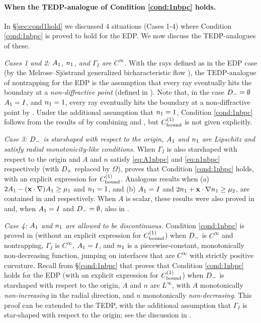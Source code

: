 \paragraph{When the TEDP-analogue of Condition \ref{cond:1nbpc} holds.}

In \S\ref{sec:cond1hold} we discussed 4 situations (Cases 1-4) where Condition \ref{cond:1nbpc} is proved to hold for the EDP. We now discuss the TEDP-analogues of these.

\emph{Cases 1 and 2: $A_{1}$, $n_{1}$, and $\Gamma_I$  are $C^\infty$.} 
With the rays defined as in the EDP case (by the Melrose--Sj{\"o}strand generalized bicharacteristic flow 
\cite[\S24.3]{Ho:85}), the TEDP-analogue of nontrapping for the EDP is the assumption that 
every ray eventually hits the boundary at a \emph{non-diffractive point} (defined in \cite[Page 1037]{BaLeRa:92}). Note that, in the case $D_{-}=\emptyset$ $A_{1}= I$, and $n_{1}=1$, every ray eventually hits the boundary at a non-diffractive point by \cite[Lemma 5.3]{BaSpWu:16}.
Under the additional assumption that $n_{1}= 1$, Condition \ref{cond:1nbpc} follows from the results of \cite{BaLeRa:92} by combining \cite[Theorem 1.8]{BaSpWu:16} and \cite[Remark 5.6]{BaSpWu:16}, but $C^{(1)}_{\rm bound}$ is not given explicitly.

\emph{Case 3: $D_{-}$ is starshaped with respect to the origin, $A_{1}$ and $n_{1}$ are Lipschitz and satisfy radial monotonicity-like conditions.}
When $\Gamma_I$ is also starshaped with respect to the origin and $A$ and $n$ satisfy \eqref{eq:A1nbpc} and \eqref{eq:n1nbpc} respectively (with $D_{+}$ replaced by $\Omega$), 
\cite[Theorem A.6(i)]{GrPeSp:19} proves that
Condition \ref{cond:1nbpc} holds, with an explicit expression for $C^{(1)}_{\rm bound}$. Analogous results when (a) $2A_{1} - (\mathbf{x}\cdot\nabla)A_{1} \geq \mu_1$ and $n_{1}= 1$,
and  (b) $A_{1}= I$ and  $2n_{1} + \mathbf{x} \cdot \nabla n_{1} \geq \mu_2$, 
are contained in \cite[Theorem A.6(ii)]{GrPeSp:19} and \cite[Theorem A.6(iii)]{GrPeSp:19} respectively.
When $A$ is scalar, these results were also proved in \cite[Theorem 1]{BrGaPe:17} and, when $A_{1}= I$ and $D_{-}=\emptyset$, also in \cite[Theorem 3.2]{GrSa:18}.

\emph{Case 4: %
 $A_{1}$ and $n_{1}$ are allowed to be discontinuous.}
Condition \ref{cond:1nbpc} is proved in \cite{CaVo:10} (without an explicit expression for $C^{(1)}_{\rm bound}$) when $D_{-}$ is $C^\infty$ and nontrapping, $\Gamma_I$ is $C^\infty$, $A_{1}= I $, and $n_{1}$ is a piecewise-constant, monotonically non-decreasing function, jumping on interfaces that are $C^\infty$ with strictly positive curvature.
Recall from \S\ref{cond:1nbpc} that \cite[Theorem 2.7]{GrPeSp:19} proves that Condition \ref{cond:1nbpc} holds for the EDP (with an explicit expression for $C^{(1)}_{\rm bound}$) when $D_{-}$ is starshaped with respect to the origin, $A$ and $n$ are $L^\infty$, with $A$ monotonically \emph{non-increasing} in the radial direction, and $n$ monotonically \emph{non-decreasing}. This proof can be extended to the TEDP, with the additional assumption that $\Gamma_I$ is star-shaped with respect to the origin; see the discussion in \cite[Section A.2]{GrPeSp:19}.

